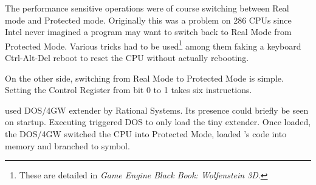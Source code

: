 The performance sensitive operations were of course switching between Real mode and Protected mode. Originally this was a problem on 286 CPUs since Intel never imagined a program may want to switch back to Real Mode from Protected Mode. Various tricks had to be used\footnote{These are detailed in \textit{Game Engine Black Book: Wolfenstein 3D}.} among them faking a keyboard Ctrl-Alt-Del reboot to reset the CPU without actually rebooting.\\
\par
On the other side, switching from Real Mode to Protected Mode is simple. Setting the Control Register from bit 0 to 1 takes six instructions.\\
\par
{}
\par

\doom{}used DOS/4GW extender by Rational Systems. Its presence could briefly be seen on startup. Executing  triggered DOS to only load the tiny extender. Once loaded, the DOS/4GW switched the CPU into Protected Mode, loaded \doom's code into memory and branched to  symbol.\\
\par
{}





